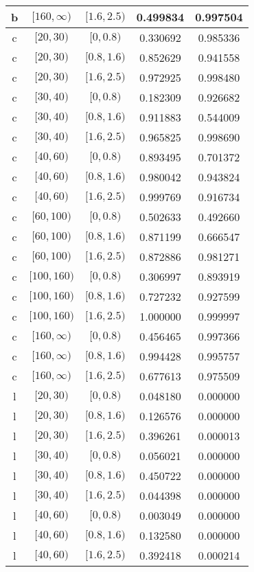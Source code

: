 \documentclass[12pt,a4paper]{article}
\begin{document}
\begin{table}[H]
\begin{center}
\begin{tabular}{ c | c | c | c | c }
		b & $[160,\infty)$ & $[1.6,2.5)$ & 0.499834 & 0.997504 \\ \hline
		c & $[20,30)$ & $[0,0.8)$ & 0.330692 & 0.985336 \\
		c & $[20,30)$ & $[0.8,1.6)$ & 0.852629 & 0.941558 \\
		c & $[20,30)$ & $[1.6,2.5)$ & 0.972925 & 0.998480 \\
		c & $[30,40)$ & $[0,0.8)$ & 0.182309 & 0.926682 \\
		c & $[30,40)$ & $[0.8,1.6)$ & 0.911883 & 0.544009 \\
		c & $[30,40)$ & $[1.6,2.5)$ & 0.965825 & 0.998690 \\
		c & $[40,60)$ & $[0,0.8)$ & 0.893495 & 0.701372 \\
		c & $[40,60)$ & $[0.8,1.6)$ & 0.980042 & 0.943824 \\
		c & $[40,60)$ & $[1.6,2.5)$ & 0.999769 & 0.916734 \\
		c & $[60,100)$ & $[0,0.8)$ & 0.502633 & 0.492660 \\
		c & $[60,100)$ & $[0.8,1.6)$ & 0.871199 & 0.666547 \\
		c & $[60,100)$ & $[1.6,2.5)$ & 0.872886 & 0.981271 \\
		c & $[100,160)$ & $[0,0.8)$ & 0.306997 & 0.893919 \\
		c & $[100,160)$ & $[0.8,1.6)$ & 0.727232 & 0.927599 \\
		c & $[100,160)$ & $[1.6,2.5)$ & 1.000000 & 0.999997 \\
		c & $[160,\infty)$ & $[0,0.8)$ & 0.456465 & 0.997366 \\
		c & $[160,\infty)$ & $[0.8,1.6)$ & 0.994428 & 0.995757 \\
		c & $[160,\infty)$ & $[1.6,2.5)$ & 0.677613 & 0.975509 \\ \hline
		l & $[20,30)$ & $[0,0.8)$ & 0.048180 & 0.000000 \\
		l & $[20,30)$ & $[0.8,1.6)$ & 0.126576 & 0.000000 \\
		l & $[20,30)$ & $[1.6,2.5)$ & 0.396261 & 0.000013 \\
		l & $[30,40)$ & $[0,0.8)$ & 0.056021 & 0.000000 \\
		l & $[30,40)$ & $[0.8,1.6)$ & 0.450722 & 0.000000 \\
		l & $[30,40)$ & $[1.6,2.5)$ & 0.044398 & 0.000000 \\
		l & $[40,60)$ & $[0,0.8)$ & 0.003049 & 0.000000 \\
		l & $[40,60)$ & $[0.8,1.6)$ & 0.132580 & 0.000000 \\
		l & $[40,60)$ & $[1.6,2.5)$ & 0.392418 & 0.000214 \\

\end{tabular}
\end{center}
\end{table}
\end{document}
